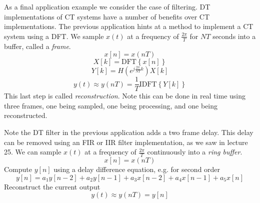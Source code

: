 As a final application example we consider the case of filtering. DT implementations of CT systems have a number of benefits over CT implementations. The previous application hints at a method to implement a CT system using a DFT. We sample $x(t)$ at a frequency of $\frac{2\pi}{T}$ for $NT$ seconds into a buffer, called a \emph{frame}.
\[
x[n] = x(nT)
\]
\[
X[k] = \text{DFT}\left\{ x[n] \right\}
\]
\[
Y[k] = H\left(e^{j\frac{2\pi}{NT} k}\right) X[k]
\]
\[
y(t) \approx y(nT) = \frac{1}{T} \text{IDFT}\left\{ Y[k] \right\}
\]
This last step is called \emph{reconstruction}. Note this can be done in real time using three frames, one being sampled, one being processing, and one being reconstructed.

Note the DT filter in the previous application adds a two frame delay. This delay can be removed using an FIR or IIR filter implementation, as we saw in lecture 25. We can sample $x(t)$ at a frequency of $\frac{2\pi}{T}$ continuously into a \emph{ring buffer}.
\[
x[n] = x(nT)
\]
Compute $y[n]$ using a delay difference equation, e.g. for second order
\[
y[n] = a_1 y[n-2] + a_2 y[n-1] + a_3 x[n-2] + a_4 x[n-1] + a_5 x[n]
\]
Reconstruct the current output
\[
y(t) \approx y(nT) = y[n]
\]

